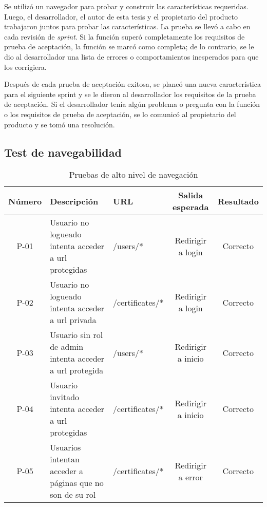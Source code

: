 Se utilizó un navegador para probar y construir las características requeridas. Luego, el desarrollador, el autor de esta tesis y el propietario del producto trabajaron juntos para probar las características. La prueba se llevó a cabo en cada revisión de \textit{sprint}. Si la función superó completamente los requisitos de prueba de aceptación, la función se marcó como completa; de lo contrario, se le dio al desarrollador una lista de errores o comportamientos inesperados para que los corrigiera.

Después de cada prueba de aceptación exitosa, se planeó una nueva característica para el siguiente sprint y se le dieron al desarrollador los requisitos de la prueba de aceptación. Si el desarrollador tenía algún problema o pregunta con la función o los requisitos de prueba de aceptación, se lo comunicó al propietario del producto y se tomó una resolución.

\subsection{Test de navegabilidad}

\begin{table}[!h]
	\begin{center}
		\begin{tabular}{|c|p{4cm}|p{3cm}|c|c|}
		\hline \textbf{Número} & \textbf{Descripción} & \textbf{URL} & \textbf{Salida esperada} & \textbf{Resultado}\\ 
		\hline P-01 & Usuario no logueado intenta acceder a url protegidas & /users/* & Redirigir a login & Correcto\\
		\hline P-02 & Usuario no logueado intenta acceder a url privada & /certificates/* & Redirigir a login & Correcto\\
		\hline P-03 & Usuario sin rol de admin intenta acceder a url protegida & /users/* & Redirigir a inicio & Correcto\\
		\hline P-04 & Usuario invitado intenta acceder a url protegidas & /certificates/* & Redirigir a inicio & Correcto\\
		\hline P-05 & Usuarios intentan acceder a páginas que no son de su rol & /certificates/* & Redirigir a error & Correcto\\
		\hline 
		\end{tabular}
		\caption{Pruebas de alto nivel de navegación}
		\label{tab:navTest}
	\end{center}
\end{table}

